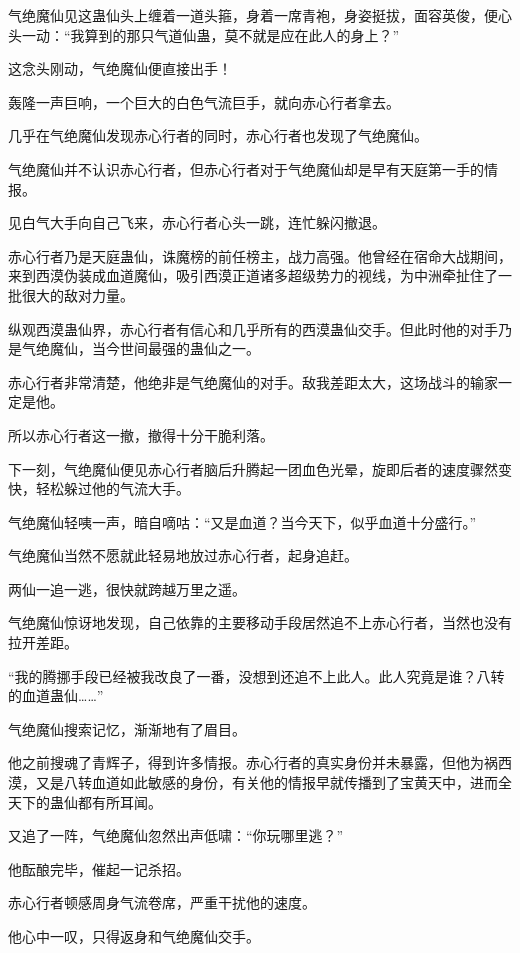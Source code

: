 
\begin{this_body}

气绝魔仙见这蛊仙头上缠着一道头箍，身着一席青袍，身姿挺拔，面容英俊，便心头一动：“我算到的那只气道仙蛊，莫不就是应在此人的身上？”

这念头刚动，气绝魔仙便直接出手！

轰隆一声巨响，一个巨大的白色气流巨手，就向赤心行者拿去。

几乎在气绝魔仙发现赤心行者的同时，赤心行者也发现了气绝魔仙。

气绝魔仙并不认识赤心行者，但赤心行者对于气绝魔仙却是早有天庭第一手的情报。

见白气大手向自己飞来，赤心行者心头一跳，连忙躲闪撤退。

赤心行者乃是天庭蛊仙，诛魔榜的前任榜主，战力高强。他曾经在宿命大战期间，来到西漠伪装成血道魔仙，吸引西漠正道诸多超级势力的视线，为中洲牵扯住了一批很大的敌对力量。

纵观西漠蛊仙界，赤心行者有信心和几乎所有的西漠蛊仙交手。但此时他的对手乃是气绝魔仙，当今世间最强的蛊仙之一。

赤心行者非常清楚，他绝非是气绝魔仙的对手。敌我差距太大，这场战斗的输家一定是他。

所以赤心行者这一撤，撤得十分干脆利落。

下一刻，气绝魔仙便见赤心行者脑后升腾起一团血色光晕，旋即后者的速度骤然变快，轻松躲过他的气流大手。

气绝魔仙轻咦一声，暗自嘀咕：“又是血道？当今天下，似乎血道十分盛行。”

气绝魔仙当然不愿就此轻易地放过赤心行者，起身追赶。

两仙一追一逃，很快就跨越万里之遥。

气绝魔仙惊讶地发现，自己依靠的主要移动手段居然追不上赤心行者，当然也没有拉开差距。

“我的腾挪手段已经被我改良了一番，没想到还追不上此人。此人究竟是谁？八转的血道蛊仙……”

气绝魔仙搜索记忆，渐渐地有了眉目。

他之前搜魂了青辉子，得到许多情报。赤心行者的真实身份并未暴露，但他为祸西漠，又是八转血道如此敏感的身份，有关他的情报早就传播到了宝黄天中，进而全天下的蛊仙都有所耳闻。

又追了一阵，气绝魔仙忽然出声低啸：“你玩哪里逃？”

他酝酿完毕，催起一记杀招。

赤心行者顿感周身气流卷席，严重干扰他的速度。

他心中一叹，只得返身和气绝魔仙交手。


\end{this_body}
